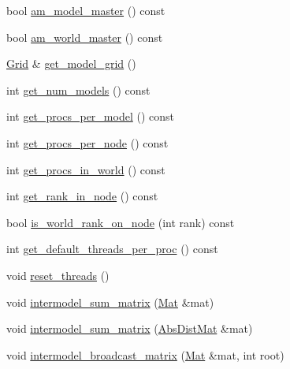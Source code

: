 \begin{DoxyCompactItemize}
\item 
bool \hyperlink{classlbann_1_1lbann__comm_ad8a5790dfa9191d4b4f889e8707e57f1}{am\+\_\+model\+\_\+master} () const
\item 
bool \hyperlink{classlbann_1_1lbann__comm_a1ef526486183a29feadca9bef096a534}{am\+\_\+world\+\_\+master} () const
\item 
\hyperlink{base_8hpp_a9951bb1719d534e0401b1f06cad19eab}{Grid} \& \hyperlink{classlbann_1_1lbann__comm_a483bf8a72d44a0e83da45f3d47bd20d4}{get\+\_\+model\+\_\+grid} ()
\item 
int \hyperlink{classlbann_1_1lbann__comm_aeb8ef8f13bbb324e3e1f656998198f3f}{get\+\_\+num\+\_\+models} () const
\item 
int \hyperlink{classlbann_1_1lbann__comm_a5755dfdfc6377b4cae5ef8f7819e17de}{get\+\_\+procs\+\_\+per\+\_\+model} () const
\item 
int \hyperlink{classlbann_1_1lbann__comm_ac5ccd63337b0cbb2fd730fddd9f8da3e}{get\+\_\+procs\+\_\+per\+\_\+node} () const
\item 
int \hyperlink{classlbann_1_1lbann__comm_a1eb92927a8f8bcbdd677ccecc1a33c59}{get\+\_\+procs\+\_\+in\+\_\+world} () const
\item 
int \hyperlink{classlbann_1_1lbann__comm_acebc5ff36fcb64c05f66757953aefb8c}{get\+\_\+rank\+\_\+in\+\_\+node} () const
\item 
bool \hyperlink{classlbann_1_1lbann__comm_a17ef6771432c3e91cd7d404d182ed531}{is\+\_\+world\+\_\+rank\+\_\+on\+\_\+node} (int rank) const
\item 
int \hyperlink{classlbann_1_1lbann__comm_a3c60c211a663801b57197dddf58356da}{get\+\_\+default\+\_\+threads\+\_\+per\+\_\+proc} () const
\item 
void \hyperlink{classlbann_1_1lbann__comm_a10f13918019cd2e021768e3388355ba2}{reset\+\_\+threads} ()
\item 
void \hyperlink{classlbann_1_1lbann__comm_a68b36ba64db34f33cb135bc64c4623e0}{intermodel\+\_\+sum\+\_\+matrix} (\hyperlink{base_8hpp_a68f11fdc31b62516cb310831bbe54d73}{Mat} \&mat)
\item 
void \hyperlink{classlbann_1_1lbann__comm_a55edcd98bf4903235ed11eb7c96f5eb4}{intermodel\+\_\+sum\+\_\+matrix} (\hyperlink{base_8hpp_a9a697a504ae84010e7439ffec862b470}{Abs\+Dist\+Mat} \&mat)
\item 
void \hyperlink{classlbann_1_1lbann__comm_a4989229db1ee858c5a2170a989653d0b}{intermodel\+\_\+broadcast\+\_\+matrix} (\hyperlink{base_8hpp_a68f11fdc31b62516cb310831bbe54d73}{Mat} \&mat, int root)
\item 

\end{DoxyCompactItemize}
